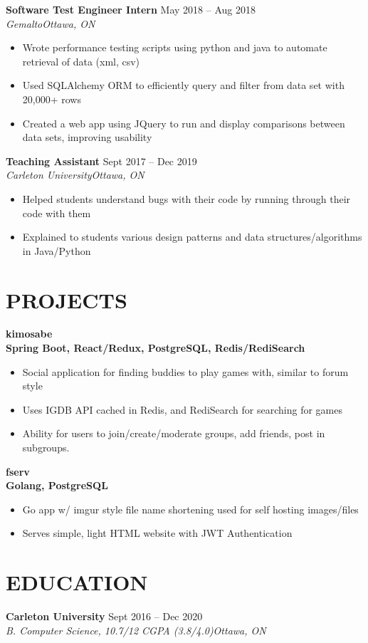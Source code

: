 \documentclass[8pt, letterpaper]{article}
\newcommand{\NewPart}[1]{\section*{\uppercase{\textbf{#1}}}}
\newcommand{\DatedEntry}[5]{\large\textbf{#1}
	\hfill #2\\\normalsize
	\textit{#3}\hfill\textit{#4}\\\vspace{0.10cm}
	#5
}
\newcommand{\ProjectEntry}[3]{\large\textbf{#1}
	\normalsize\\ \textbf{#2}\\\vspace{0.1cm}
	#3\vspace{0.12cm}
}
\begin{document}
\DatedEntry{Software Test Engineer Intern}
{May 2018 -- Aug 2018}
{Gemalto}
{Ottawa, ON}
{\begin{itemize}[nolistsep]
	\item Wrote performance testing scripts using python and java to automate retrieval of data (xml, csv)
	\item Used SQLAlchemy ORM to efficiently query and filter from data set with 20,000+ rows
	\item Created a web app using JQuery to run and display comparisons between data sets, improving usability
\end{itemize}}
\DatedEntry{Teaching Assistant}
{Sept 2017 -- Dec 2019}
{Carleton University}
{Ottawa, ON}
{\begin{itemize}[nolistsep]
	\item Helped students understand bugs with their code by running through their code with them
	\item Explained to students various design patterns and data structures/algorithms  in Java/Python
\end{itemize}}

\NewPart{Projects}{}
\ProjectEntry{kimosabe}
{Spring Boot, React/Redux, PostgreSQL, Redis/RediSearch}
{\begin{itemize}
	\item Social application for finding buddies to play games with, similar to forum style
	\item Uses IGDB API cached in Redis, and RediSearch for searching for games
	\item Ability for users to join/create/moderate groups, add friends, post in subgroups.
\end{itemize}}
\ProjectEntry{fserv}
{Golang, PostgreSQL}
{\begin{itemize}
	\item Go app w/ imgur style file name shortening used for self hosting images/files
	\item Serves simple, light HTML website with JWT Authentication
\end{itemize}}

\NewPart{Education}{}
\DatedEntry{Carleton University}
{Sept 2016 -- Dec 2020}
{B. Computer Science, 10.7/12 CGPA (3.8/4.0)}
{Ottawa, ON}
\end{document}
